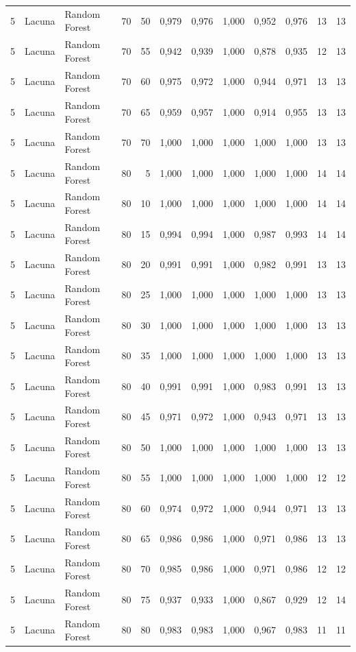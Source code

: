 \begin{longtable}{@{}rllrrrrrrrrr@{}}
5 & Lacuna & Random Forest & 70 & 50 & 0,979 & 0,976 & 1,000 & 0,952 & 0,976 & 13 & 13 \\
5 & Lacuna & Random Forest & 70 & 55 & 0,942 & 0,939 & 1,000 & 0,878 & 0,935 & 12 & 13 \\
5 & Lacuna & Random Forest & 70 & 60 & 0,975 & 0,972 & 1,000 & 0,944 & 0,971 & 13 & 13 \\
5 & Lacuna & Random Forest & 70 & 65 & 0,959 & 0,957 & 1,000 & 0,914 & 0,955 & 13 & 13 \\
5 & Lacuna & Random Forest & 70 & 70 & 1,000 & 1,000 & 1,000 & 1,000 & 1,000 & 13 & 13 \\
5 & Lacuna & Random Forest & 80 & 5 & 1,000 & 1,000 & 1,000 & 1,000 & 1,000 & 14 & 14 \\
5 & Lacuna & Random Forest & 80 & 10 & 1,000 & 1,000 & 1,000 & 1,000 & 1,000 & 14 & 14 \\
5 & Lacuna & Random Forest & 80 & 15 & 0,994 & 0,994 & 1,000 & 0,987 & 0,993 & 14 & 14 \\
5 & Lacuna & Random Forest & 80 & 20 & 0,991 & 0,991 & 1,000 & 0,982 & 0,991 & 13 & 13 \\
5 & Lacuna & Random Forest & 80 & 25 & 1,000 & 1,000 & 1,000 & 1,000 & 1,000 & 13 & 13 \\
5 & Lacuna & Random Forest & 80 & 30 & 1,000 & 1,000 & 1,000 & 1,000 & 1,000 & 13 & 13 \\
5 & Lacuna & Random Forest & 80 & 35 & 1,000 & 1,000 & 1,000 & 1,000 & 1,000 & 13 & 13 \\
5 & Lacuna & Random Forest & 80 & 40 & 0,991 & 0,991 & 1,000 & 0,983 & 0,991 & 13 & 13 \\
5 & Lacuna & Random Forest & 80 & 45 & 0,971 & 0,972 & 1,000 & 0,943 & 0,971 & 13 & 13 \\
5 & Lacuna & Random Forest & 80 & 50 & 1,000 & 1,000 & 1,000 & 1,000 & 1,000 & 13 & 13 \\
5 & Lacuna & Random Forest & 80 & 55 & 1,000 & 1,000 & 1,000 & 1,000 & 1,000 & 12 & 12 \\
5 & Lacuna & Random Forest & 80 & 60 & 0,974 & 0,972 & 1,000 & 0,944 & 0,971 & 13 & 13 \\
5 & Lacuna & Random Forest & 80 & 65 & 0,986 & 0,986 & 1,000 & 0,971 & 0,986 & 13 & 13 \\
5 & Lacuna & Random Forest & 80 & 70 & 0,985 & 0,986 & 1,000 & 0,971 & 0,986 & 12 & 12 \\
5 & Lacuna & Random Forest & 80 & 75 & 0,937 & 0,933 & 1,000 & 0,867 & 0,929 & 12 & 14 \\
5 & Lacuna & Random Forest & 80 & 80 & 0,983 & 0,983 & 1,000 & 0,967 & 0,983 & 11 & 11 \\

\end{longtable}
